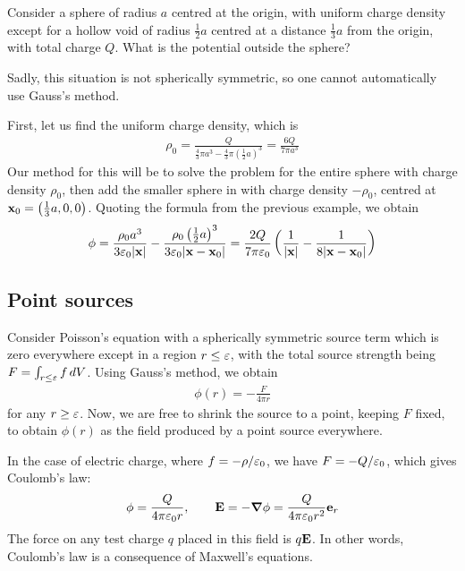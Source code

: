 \documentclass{../../template/note}
\begin{document}
    \begin{example*}
        Consider a sphere of radius \(a\) centred at the origin, with uniform charge density except for a hollow void of radius \(\frac 1 2 a\) centred at a distance \(\frac 1 3 a\) from the origin, with total charge \(Q\). What is the potential outside the sphere?

        Sadly, this situation is not spherically symmetric, so one cannot automatically use Gauss's method.

        First, let us find the uniform charge density, which is
        \begin{align*}
            \rho_0 = \frac{Q}{\frac 4 3 \pi a^3 - \frac 4 3\pi\left(\frac 1 2a\right)^3} = \frac{6Q}{7\pi a^3}
        \end{align*}
        Our method for this will be to solve the problem for the entire sphere with charge density \(\rho_0\), then add the smaller sphere in with charge density \(-\rho_0\), centred at \(\V x_0 = \left(\frac 1 3 a, 0, 0\right)\). Quoting the formula from the previous example, we obtain
        \begin{align*}
            \phi = \frac{\rho_0a^3}{3\eps_0|\V x|} - \frac{\rho_0\left(\frac 1 2 a\right)^3}{3\eps_0|\V x - \V x_0|} = \frac{2Q}{7\pi\eps_0}\left(\frac 1{|\V x|} - \frac 1{8|\V x - \V x_0|}\right)
        \end{align*}
    \end{example*}
    
    \subsection{Point sources}
    
    Consider Poisson's equation with a spherically symmetric source term which is zero everywhere except in a region \(r \leq \varepsilon\), with the total source strength being \(F = \int_{r \leq \varepsilon} f \,d{V}\). Using Gauss's method, we obtain
    \begin{align*}
        \phi(r) = -\frac{F}{4\pi r}
    \end{align*}
    for any \(r \geq \varepsilon\). Now, we are free to shrink the source to a point, keeping \(F\) fixed, to obtain \(\phi(r)\) as the field produced by a point source everywhere.
    

    In the case of electric charge, where \(f = -\rho/\varepsilon_0\), we have \(F = -Q/\varepsilon_0\), which gives Coulomb's law:
    \begin{align*}
        \phi = \frac{Q}{4\pi \eps_0 r}, \qquad \V E = -\grad \phi = \frac{Q}{4\pi \eps_0 r^2} \V e_r
    \end{align*}
    The force on any test charge \(q\) placed in this field is \(q\V E\). In other words, Coulomb's law is a consequence of Maxwell's equations.
\end{document}
